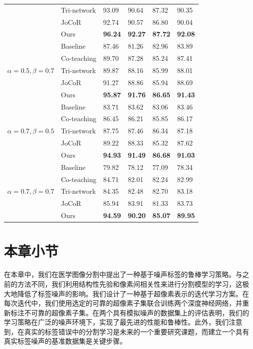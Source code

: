 \begin{table}[thb]
{\begin{tabular}{P{3.0cm}|M{3.0cm}|M{2.0cm}|M{2.0cm}|M{2.0cm}|M{2.0cm}}
                & Tri-network  & 93.09  &90.64   &87.32   & 90.35   \\ 
                & JoCoR  & 92.74  &90.57    &86.80   & 90.04  \\ 
                & Ours  &\textbf{96.24 }  &\textbf{92.27}   &\textbf{87.72}   &  \textbf{92.08}  \\ \midrule
                & Baseline  &87.46   &81.26   &82.96   & 83.89   \\ 
                & Co-teaching  &89.70   &87.28   &85.24   & 87.41   \\ 
                & Tri-network  &89.87   &88.16   &85.99   & 88.01   \\ 
                & JoCoR  &91.27   &88.86   &85.94   & 88.69   \\ 
                & Ours  &\textbf{95.87 }  &\textbf{91.76}   &\textbf{86.65}   &  \textbf{91.43}  \\ \midrule
                & Baseline  &83.71   &83.62   &83.06   & 83.46   \\ 
                & Co-teaching  &86.45   & 86.21  &85.85  & 86.17   \\ 
                & Tri-network  &87.75   & 87.46   &86.34   & 87.18   \\ 
                & JoCoR  &89.22   &88.33   &85.32   & 87.62   \\ 
                & Ours  &\textbf{94.93 }  &\textbf{91.49}   &\textbf{86.68}   &  \textbf{91.03}   \\ \midrule
                & Baseline  &79.82   &78.12   &77.09   & 78.34   \\ 
                & Co-teaching  &84.71   &82.01   &82.24   & 82.99   \\ 
                & Tri-network  &84.35   &82.48   &82.70   & 83.18   \\ 
                & JoCoR  &85.94   &83.91   &81.33   & 83.73   \\ 
                & Ours  &\textbf{94.59}   &\textbf{90.20}   &\textbf{85.07}   &  \textbf{89.95}  \\ 
                \bottomrule
            \end{tabular}
        }
    \end{table}



\section{本章小节}
在本章中，我们在医学图像分割中提出了一种基于噪声标签的鲁棒学习策略。与之前的方法不同，我们利用结构性先验和像素间相关性来进行分割模型的学习，这极大地降低了标签噪声的影响。我们设计了一种基于超像素表示的迭代学习方案。在每次迭代中，我们使用选定的可靠的超像素子集联合训练两个深度神经网络，并重新标注不可靠的超像素子集。在两个具有模拟噪声的数据集上的评估表明，我们的学习策略在广泛的噪声环境下，实现了最先进的性能和鲁棒性。此外，我们注意到，在真实的标签错误中的分割学习是未来的一个重要研究课题，而建立一个具有真实标签噪声的基准数据集是关键步骤。